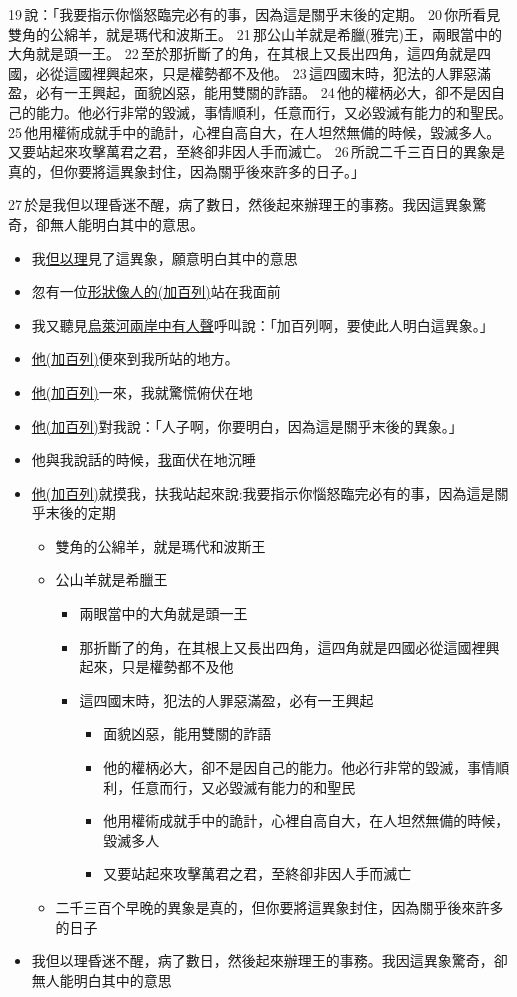 19 說：「我要指示你惱怒臨完必有的事，因為這是關乎末後的定期。 20 你所看見雙角的公綿羊，就是瑪代和波斯王。 21 那公山羊就是希臘(雅完)王，兩眼當中的大角就是頭一王。 22 至於那折斷了的角，在其根上又長出四角，這四角就是四國，必從這國裡興起來，只是權勢都不及他。 23 這四國末時，犯法的人罪惡滿盈，必有一王興起，面貌凶惡，能用雙關的詐語。 24 他的權柄必大，卻不是因自己的能力。他必行非常的毀滅，事情順利，任意而行，又必毀滅有能力的和聖民。 25 他用權術成就手中的詭計，心裡自高自大，在人坦然無備的時候，毀滅多人。又要站起來攻擊萬君之君，至終卻非因人手而滅亡。 26 所說二千三百日的異象是真的，但你要將這異象封住，因為關乎後來許多的日子。」 

27 於是我但以理昏迷不醒，病了數日，然後起來辦理王的事務。我因這異象驚奇，卻無人能明白其中的意思。

\begin{itemize}
\itemsep-.45em  
\item 我\underline{但以理}見了這異象，願意明白其中的意思
\item 忽有一位\underline{形狀像人的(加百列)}站在我面前
\item 我又聽見\underline{烏萊河兩岸中有人聲}呼叫說：「加百列啊，要使此人明白這異象。」
\item \underline{他(加百列)}便來到我所站的地方。
\item \underline{他(加百列)}一來，我就驚慌俯伏在地
\item \underline{他(加百列)}對我說：「人子啊，你要明白，因為這是關乎末後的異象。」
\item 他與我說話的時候，\underline{我}面伏在地沉睡
\item \underline{他(加百列)}就摸我，扶我站起來說:我要指示你惱怒臨完必有的事，因為這是關乎末後的定期
\begin{itemize}
\itemsep-.45em  
\item 雙角的公綿羊，就是瑪代和波斯王
\item 公山羊就是希臘王
\begin{itemize}
\itemsep-.45em  
\item 兩眼當中的大角就是頭一王
\item 那折斷了的角，在其根上又長出四角，這四角就是四國必從這國裡興起來，只是權勢都不及他
\item 這四國末時，犯法的人罪惡滿盈，必有一王興起
\begin{itemize}
\itemsep-.45em  
\item 面貌凶惡，能用雙關的詐語
\item 他的權柄必大，卻不是因自己的能力。他必行非常的毀滅，事情順利，任意而行，又必毀滅有能力的和聖民
\item 他用權術成就手中的詭計，心裡自高自大，在人坦然無備的時候，毀滅多人
\item 又要站起來攻擊萬君之君，至終卻非因人手而滅亡
\end{itemize}
\end{itemize}
\item 二千三百个早晚的異象是真的，但你要將這異象封住，因為關乎後來許多的日子
\end{itemize}
\item 我但以理昏迷不醒，病了數日，然後起來辦理王的事務。我因這異象驚奇，卻無人能明白其中的意思
\end{itemize}



